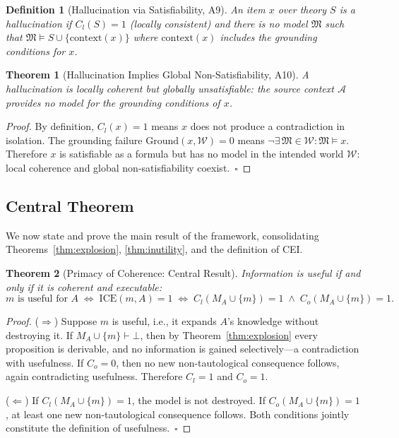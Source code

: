 \documentclass{article}
\newcommand{\ICE}{\mathrm{ICE}}
\newcommand{\MA}{M_A}
\newtheorem{theorem}{Theorem}
\newtheorem{definition}{Definition}
\begin{document}
\begin{definition}[Hallucination via Satisfiability, A9]
An item $x$ over theory $S$ is a hallucination if $C_l(S) = 1$ (locally
consistent) and there is no model $\mathfrak{M}$ such that $\mathfrak{M}
\models S \cup \{\mathrm{context}(x)\}$ where $\mathrm{context}(x)$ includes
the grounding conditions for $x$.
\end{definition}

\begin{theorem}[Hallucination Implies Global Non-Satisfiability, A10]
\label{thm:hall-unsat}
A hallucination is locally coherent but globally unsatisfiable: the source
context $\mathcal{A}$ provides no model for the grounding conditions of $x$.
\end{theorem}

\begin{proof}
By definition, $C_l(x) = 1$ means $x$ does not produce a contradiction in
isolation.  The grounding failure $\mathrm{Ground}(x, \mathcal{W}) = 0$
means $\neg\exists\, \mathfrak{M} \in \mathcal{W} : \mathfrak{M} \models x$.
Therefore $x$ is satisfiable as a formula but has no model in the intended
world $\mathcal{W}$: local coherence and global non-satisfiability coexist.~$\square$
\end{proof}

\subsection{Central Theorem}
\label{app:central}

We now state and prove the main result of the framework, consolidating
Theorems~\ref{thm:explosion}, \ref{thm:inutility}, and the definition of CEI.

\begin{theorem}[Primacy of Coherence: Central Result]
\label{thm:central}
Information is useful if and only if it is coherent and executable:
\[
  m \text{ is useful for } A
  \;\iff\;
  \ICE(m, A) = 1
  \;\iff\;
  C_l(\MA \cup \{m\}) = 1 \;\wedge\; C_o(\MA \cup \{m\}) = 1.
\]
\end{theorem}

\begin{proof}
($\Rightarrow$) Suppose $m$ is useful, i.e., it expands $A$'s knowledge
without destroying it.  If $\MA \cup \{m\} \vdash \bot$, then by
Theorem~\ref{thm:explosion} every proposition is derivable, and no information
is gained selectively---a contradiction with usefulness.  If $C_o = 0$, then
no new non-tautological consequence follows, again contradicting usefulness.
Therefore $C_l = 1$ and $C_o = 1$.

($\Leftarrow$) If $C_l(\MA \cup \{m\}) = 1$, the model is not destroyed.  If
$C_o(\MA \cup \{m\}) = 1$, at least one new non-tautological consequence
follows.  Both conditions jointly constitute the definition of usefulness.~$\square$
\end{proof}
\end{document}
